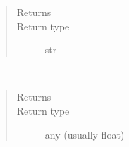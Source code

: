 \documentclass[letterpaper,10pt,english]{sphinxmanual}
\begin{document}
\begin{fulllineitems}
\begin{fulllineitems}
\begin{quote}
\begin{description}
\begin{itemize}
\end{itemize}

\item[{Returns}] \leavevmode
{}

\item[{Return type}] \leavevmode
str

\end{description}\end{quote}

\end{fulllineitems}


\begin{fulllineitems}
\label{\detokenize{Reference:salabim.Distribution.sample}}~\begin{quote}\begin{description}
\item[{Returns}] \leavevmode
{}

\item[{Return type}] \leavevmode
any (usually float)

\end{description}\end{quote}

\end{fulllineitems}


\end{fulllineitems}

\end{document}

